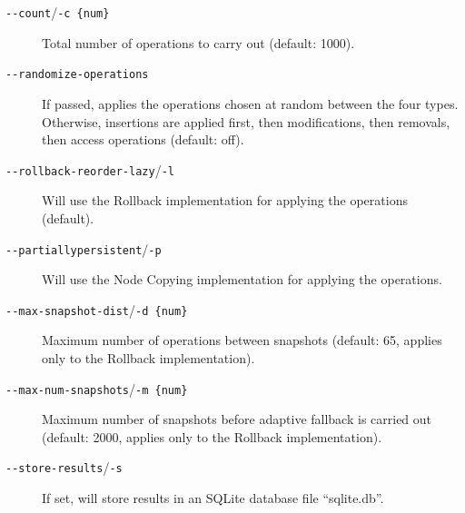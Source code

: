 \begin{description}

  \item[\texttt{-\@{}-count}/\texttt{-c \{num\}}] Total number of operations to carry
  out (default: 1000).

  \item[\texttt{-\@{}-randomize-operations}] If passed, applies the operations
  chosen at random between the four types. Otherwise, insertions are applied
  first, then modifications, then removals, then access operations (default:
  off).

  \item[\texttt{-\@{}-rollback-reorder-lazy}/\texttt{-l}] Will use the Rollback
  implementation for applying the operations (default).

  \item[\texttt{-\@{}-partiallypersistent}/\texttt{-p}] Will use the Node
  Copying implementation for applying the operations.

  \item[\texttt{-\@{}-max-snapshot-dist}/\texttt{-d \{num\}}] Maximum number of
  operations between snapshots (default: 65, applies only to the Rollback
  implementation).

  \item[\texttt{-\@{}-max-num-snapshots}/\texttt{-m \{num\}}] Maximum number of
  snapshots before adaptive fallback is carried out (default: 2000, applies only to the Rollback
  implementation).

  \item[\texttt{-\@{}-store-results}/\texttt{-s}] If set, will store results in
  an SQLite database file ``sqlite.db''.

\end{description}

